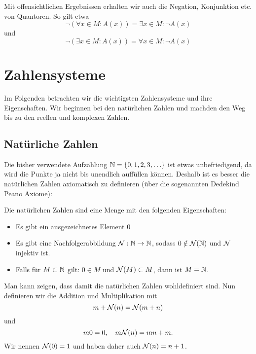 Mit offensichtlichen Ergebnissen erhalten wir auch die Negation, Konjunktion etc. von Quantoren. So gilt etwa
\begin{equation*}
\lnot( \forall x \in M: A(x) ) = \exists x \in M: \lnot A(x)
\end{equation*}
und
\begin{equation*}
\lnot( \exists x \in M: A(x) ) = \forall x \in M: \lnot A(x)
\end{equation*}

\section{Zahlensysteme}
\label{\detokenize{grundlagen/zahlensysteme:zahlensysteme}}\label{\detokenize{grundlagen/zahlensysteme::doc}}
Im Folgenden betrachten wir die wichtigsten Zahlensysteme und ihre Eigenschaften. Wir beginnen bei den natürlichen Zahlen und machden den Weg bis zu den reellen und komplexen Zahlen.


\subsection{Natürliche Zahlen}
\label{\detokenize{grundlagen/zahlensysteme:naturliche-zahlen}}
Die bisher verwendete Aufzählung \(\mathbb{N} = \{0,1,2,3,\ldots\}\) ist etwas unbefriedigend, da wird die Punkte ja nicht bis unendlich auffüllen können. Deshalb ist es besser die natürlichen Zahlen axiomatisch zu definieren (über die sogenannten Dedekind Peano Axiome):
\label{grundlagen/zahlensysteme:definition-0}
\begin{definition}{}{}



Die natürlichen Zahlen sind eine Menge mit den folgenden Eigenschaften:
\begin{itemize}
\item {} 
Es gibt ein ausgezeichnetes Element \(0\)

\item {} 
Es gibt eine Nachfolgerabbildung \({\cal N}:\mathbb{N} \rightarrow \mathbb{N}\), sodass \(0 \notin {\cal N}(\mathbb{N})\) und \({\cal N}\) injektiv ist.

\item {} 
Falls für \(M \subset \mathbb{N}\) gilt: \(0 \in M\) und \({\cal N}(M) \subset M\), dann ist \(M=\mathbb{N}\).

\end{itemize}
\end{definition}

Man kann zeigen, dass damit die natürlichen Zahlen wohldefiniert sind. Nun definieren wir die Addition und Multiplikation mit
\begin{equation*}
 m + {\cal N}(n) = {\cal N}(m+n)
\end{equation*}
und
\begin{equation*}
 m 0 = 0, \quad m {\cal N}(n) = mn +m.
\end{equation*}
Wir nennen \({\cal N}(0)=1\) und haben daher auch
\( {\cal N}(n) = n+1\).


